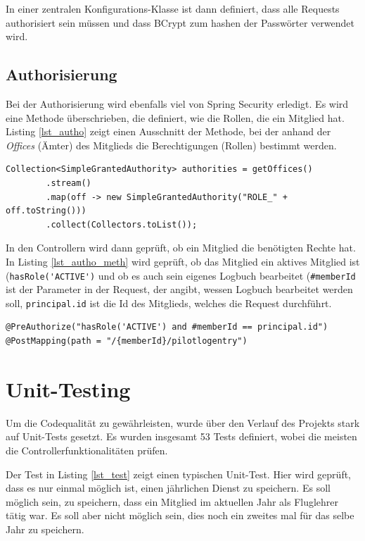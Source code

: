 \documentclass[a4paper, 11pt]{article}
\begin{document}
In einer zentralen Konfigurations-Klasse ist dann definiert, dass alle Requests
authorisiert sein müssen und dass BCrypt zum hashen der Passwörter verwendet
wird.

\subsection{Authorisierung}

Bei der Authorisierung wird ebenfalls viel von Spring Security erledigt. Es
wird eine Methode überschrieben, die definiert, wie die Rollen, die ein
Mitglied hat. Listing \ref{lst_autho} zeigt einen Ausschnitt der Methode, bei
der anhand der \emph{Offices} (Ämter) des Mitglieds die Berechtigungen (Rollen)
bestimmt werden.

\begin{lstlisting}[caption=Bestimmung der Rollen anhand der Ämter, label=lst_autho]
Collection<SimpleGrantedAuthority> authorities = getOffices()
        .stream()
        .map(off -> new SimpleGrantedAuthority("ROLE_" + off.toString()))
        .collect(Collectors.toList());
\end{lstlisting}

In den Controllern wird dann geprüft, ob ein Mitglied die benötigten Rechte
hat. In Listing \ref{lst_autho_meth} wird geprüft, ob das Mitglied ein aktives
Mitglied ist (\lstinline{hasRole('ACTIVE')} und ob es auch sein eigenes Logbuch
bearbeitet (\lstinline{#memberId} ist der Parameter in der Request, der angibt,
wessen Logbuch bearbeitet werden soll, \lstinline{principal.id} ist die Id des
Mitglieds, welches die Request durchführt.

\begin{lstlisting}[caption=Beispiel Berechtigungsprüfung, label=lst_autho_meth]
@PreAuthorize("hasRole('ACTIVE') and #memberId == principal.id")
@PostMapping(path = "/{memberId}/pilotlogentry")
\end{lstlisting}

\section{Unit-Testing}

Um die Codequalität zu gewährleisten, wurde über den Verlauf des Projekts stark
auf Unit-Tests gesetzt. Es wurden insgesamt 53 Tests definiert, wobei die
meisten die Controllerfunktionalitäten prüfen.

Der Test in Listing \ref{lst_test} zeigt einen typischen Unit-Test. Hier wird
geprüft, dass es nur einmal möglich ist, einen jährlichen Dienst zu speichern.
Es soll möglich sein, zu speichern, dass ein Mitglied im aktuellen Jahr als
Fluglehrer tätig war. Es soll aber nicht möglich sein, dies noch ein zweites
mal für das selbe Jahr zu speichern.
\end{document}
